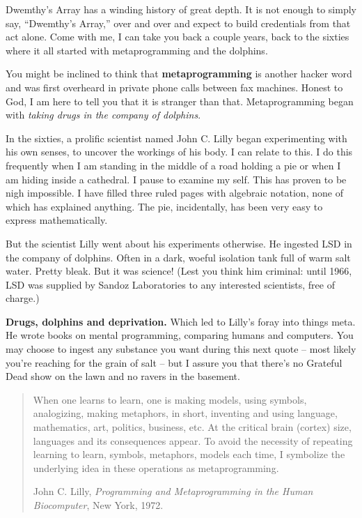 \documentclass[12pt,twoside]{report}
\begin{document}
Dwemthy's Array has a winding history of great depth.  It is not
enough to simply say, ``Dwemthy's Array,'' over and over and expect to
build credentials from that act alone.  Come with me, I can take you
back a couple years, back to the sixties where it all started with
metaprogramming and the dolphins.

You might be inclined to think that {\bf metaprogramming} is another
hacker word and was first overheard in private phone calls between fax
machines.  Honest to God, I am here to tell you that it is stranger
than that. Metaprogramming began with {\em taking drugs in the company
  of dolphins}.

In the sixties, a prolific scientist named John C. Lilly began
experimenting with his own senses, to uncover the workings of his
body.  I can relate to this.  I do this frequently when I am standing
in the middle of a road holding a pie or when I am hiding inside a
cathedral.  I pause to examine my self.  This has proven to be nigh
impossible.  I have filled three ruled pages with algebraic notation,
none of which has explained anything.  The pie, incidentally, has been
very easy to express mathematically.

But the scientist Lilly went about his experiments otherwise.  He
ingested LSD in the company of dolphins. Often in a dark, woeful
isolation tank full of warm salt water.  Pretty bleak.  But it was
science!  (Lest you think him criminal: until 1966, LSD was supplied
by Sandoz Laboratories to any interested scientists, free of charge.)

{\bf Drugs, dolphins and deprivation.}  Which led to Lilly's foray
into things meta.  He wrote books on mental programming, comparing
humans and computers.  You may choose to ingest any substance you want
during this next quote -- most likely you're reaching for the grain of
salt -- but I assure you that there's no Grateful Dead show on the
lawn and no ravers in the basement.

\begin{quote}
When one learns to learn, one is making models, using symbols,
analogizing, making metaphors, in short, inventing and using language,
mathematics, art, politics, business, etc. At the critical brain
(cortex) size, languages and its consequences appear. To avoid the
necessity of repeating learning to learn, symbols, metaphors, models
each time, I symbolize the underlying idea in these operations as
metaprogramming.

John C. Lilly, {\em Programming and Metaprogramming in the Human
  Biocomputer}, New York, 1972.

\end{quote}
\end{document}
